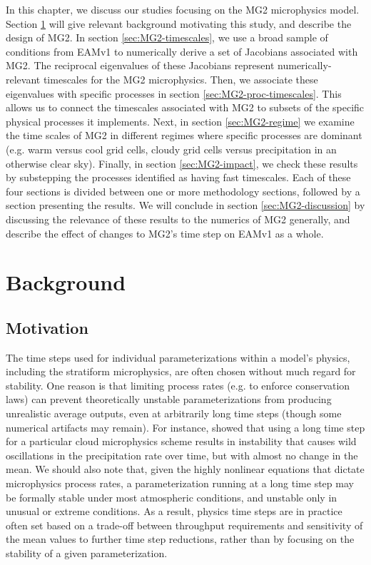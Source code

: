 \documentclass [11pt, proquest] {uwthesis}[2020/02/24]
\begin{document}
In this chapter, we discuss our studies focusing on the MG2 microphysics model. Section \ref{sec:MG2-background} will give relevant background motivating this study, and describe the design of MG2. In section \ref{sec:MG2-timescales}, we use a broad sample of conditions from EAMv1 to numerically derive a set of Jacobians associated with MG2. The reciprocal eigenvalues of these Jacobians represent numerically-relevant timescales for the MG2 microphysics. Then, we associate these eigenvalues with specific processes in section \ref{sec:MG2-proc-timescales}. This allows us to connect the timescales associated with MG2 to subsets of the specific physical processes it implements. Next, in section \ref{sec:MG2-regime} we examine the time scales of MG2 in different regimes where specific processes are dominant (e.g. warm versus cool grid cells, cloudy grid cells versus precipitation in an otherwise clear sky). Finally, in section \ref{sec:MG2-impact}, we check these results by substepping the processes identified as having fast timescales. Each of these four sections is divided between one or more methodology sections, followed by a section presenting the results. We will conclude in section \ref{sec:MG2-discussion} by discussing the relevance of these results to the numerics of MG2 generally, and describe the effect of changes to MG2's time step on EAMv1 as a whole.

\section{Background} \label{sec:MG2-background}

\subsection{Motivation}

The time steps used for individual parameterizations within a model's physics, including the stratiform microphysics, are often chosen without much regard for stability. One reason is that limiting process rates (e.g. to enforce conservation laws) can prevent theoretically unstable parameterizations from producing unrealistic average outputs, even at arbitrarily long time steps (though some numerical artifacts may remain). For instance, \textcite{Morrison2008} showed that using a long time step for a particular cloud microphysics scheme results in instability that causes wild oscillations in the precipitation rate over time, but with almost no change in the mean. We should also note that, given the highly nonlinear equations that dictate microphysics process rates, a parameterization running at a long time step may be formally stable under most atmospheric conditions, and unstable only in unusual or extreme conditions. As a result, physics time steps are in practice often set based on a trade-off between throughput requirements and sensitivity of the mean values to further time step reductions, rather than by focusing on the stability of a given parameterization.
\end{document}
